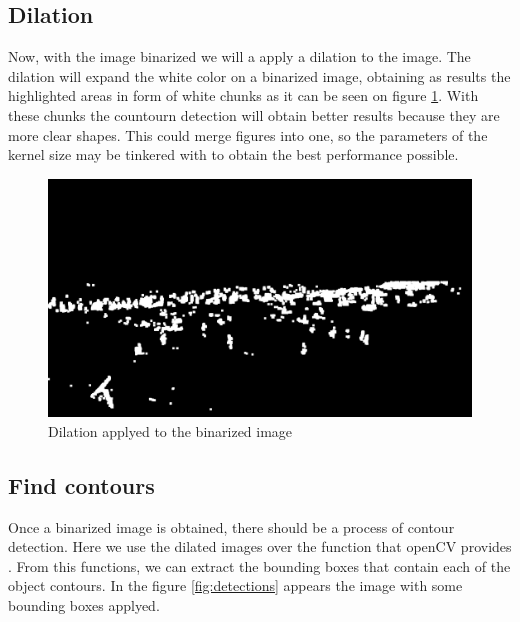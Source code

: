 \documentclass[10pt]{article}
\begin{document}
\subsection{Dilation}
Now, with the image binarized we will a apply a dilation to the image. The dilation will expand the white color on a binarized image, obtaining as results the highlighted areas in form of white chunks as it can be seen on figure \ref{fig:dilation_ex}. With these chunks the countourn detection will obtain better results because they are more clear shapes. This could merge figures into one, so the parameters of the kernel size may be tinkered with to obtain the best performance possible.

\begin{figure}[htb]
    \centering
    \includegraphics[width=\textwidth]{img/dil.jpg}
    \caption{Dilation applyed to the binarized image}
    \label{fig:dilation_ex}
\end{figure}

\subsection{Find contours}
Once a binarized image is obtained, there should be a process of contour detection. Here we use the dilated images over the function that openCV provides . From this functions, we can extract the bounding boxes that contain each of the object contours. In the figure \ref{fig:detections} appears the image with some bounding boxes applyed.
\end{document}
